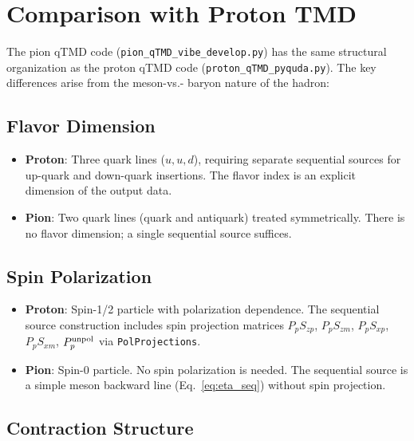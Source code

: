 \documentclass[11pt,a4paper]{article}
\begin{document}
\section{Comparison with Proton TMD}
\label{sec:comparison}

The pion qTMD code (\verb|pion_qTMD_vibe_develop.py|) has the same structural
organization as the proton qTMD code
(\verb|proton_qTMD_pyquda.py|).  The key differences arise from the meson-vs.-
baryon nature of the hadron:

\subsection{Flavor Dimension}

\begin{itemize}[nosep]
  \item \textbf{Proton}: Three quark lines ($u,u,d$), requiring separate
        sequential sources for up-quark and down-quark insertions.  The flavor
        index is an explicit dimension of the output data.
  \item \textbf{Pion}: Two quark lines (quark and antiquark) treated
        symmetrically.  There is no flavor dimension; a single sequential
        source suffices.
\end{itemize}

\subsection{Spin Polarization}

\begin{itemize}[nosep]
  \item \textbf{Proton}: Spin-1/2 particle with polarization dependence.  The
        sequential source construction includes spin projection matrices
        $P_pS_{zp}$, $P_pS_{zm}$, $P_pS_{xp}$, $P_pS_{xm}$, $P_p^{\rm unpol}$
        via \texttt{PolProjections}.
  \item \textbf{Pion}: Spin-0 particle.  No spin polarization is needed.  The
        sequential source is a simple meson backward line (Eq.~\ref{eq:eta_seq})
        without spin projection.
\end{itemize}

\subsection{Contraction Structure}
\end{document}
